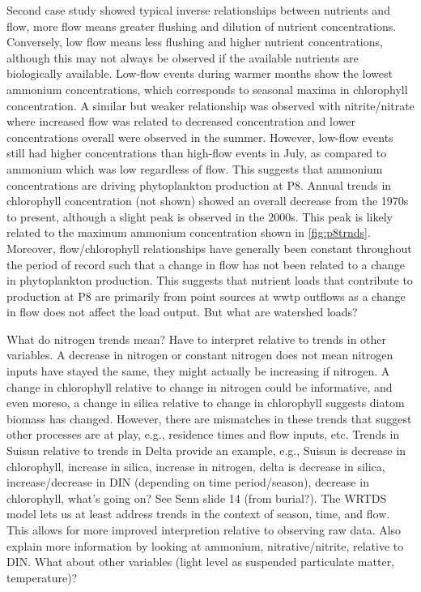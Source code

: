 \documentclass[journal = esthag, manuscript = article]{achemso}\usepackage[]{graphicx}\usepackage[]{color}
\begin{document}
Second case study showed typical inverse relationships between nutrients and flow, more flow means greater flushing and dilution of nutrient concentrations.  Conversely, low flow means less flushing and higher nutrient concentrations, although this may not always be observed if the available nutrients are biologically available.  Low-flow events during warmer months show the lowest ammonium concentrations, which corresponds to seasonal maxima in chlorophyll concentration.  A similar but weaker relationship was observed with nitrite/nitrate where increased flow was related to decreased concentration and lower concentrations overall were observed in the summer.  However, low-flow events still had higher concentrations than high-flow events in July, as compared to ammonium which was low regardless of flow.  This suggests that ammonium concentrations are driving phytoplankton production at P8.  Annual trends in chlorophyll concentration (not shown) showed an overall decrease from the 1970s to present, although a slight peak is observed in the 2000s.  This peak is likely related to the maximum ammonium concentration shown in \cref{fig:p8trnds}.  Moreover, flow/chlorophyll relationships have generally been constant throughout the period of record such that a change in flow has not been related to a change in phytoplankton production.  This suggests that nutrient loads that contribute to production at P8 are primarily from point sources at \ac{wwtp} outflows as a change in flow does not affect the load output.  But what are watershed loads?  

What do nitrogen trends mean?  Have to interpret relative to trends in other variables.  A decrease in nitrogen or constant nitrogen does not mean nitrogen inputs have stayed the same, they might actually be increasing if nitrogen.  A change in chlorophyll relative to change in nitrogen could be informative, and even moreso, a change in silica relative to change in chlorophyll suggests diatom biomass has changed.  However, there are mismatches in these trends that suggest other processes are at play, e.g., residence times and flow inputs, etc.  Trends in Suisun relative to trends in Delta provide an example, e.g., Suisun is decrease in chlorophyll, increase in silica, increase in nitrogen, delta is decrease in silica, increase/decrease in DIN (depending on time period/season), decrease in chlorophyll, what's going on? See Senn slide 14 (from burial?). The WRTDS model lets us at least address trends in the context of season, time, and flow.  This allows for more improved interpretion relative to observing raw data. Also explain more information by looking at ammonium, nitrative/nitrite, relative to DIN. What about other variables (light level as suspended particulate matter, temperature)?
\end{document}
